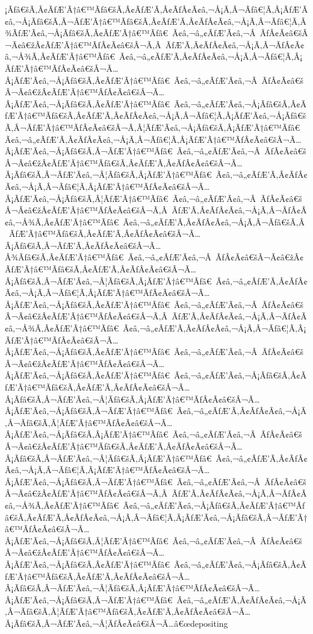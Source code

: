 \documentclass{article}
\begin{document}
\begin{outline}[enumerate]
¡Ãƒâ€šÃ‚Â¢ÃƒÆ’Ã†â€™Ãƒâ€šÃ‚Â¢ÃƒÆ’Ã‚Â¢ÃƒÂ¢Ã¢â‚¬Å¡Ã‚Â¬Ãƒâ€¦Ã‚Â¡ÃƒÆ’Ã¢â‚¬Å¡Ãƒâ€šÃ‚Â¬ÃƒÆ’Ã†â€™Ãƒâ€šÃ‚Â¢ÃƒÆ’Ã‚Â¢ÃƒÂ¢Ã¢â‚¬Å¡Ã‚Â¬Ãƒâ€¦Ã‚Â¾ÃƒÆ’Ã¢â‚¬Å¡Ãƒâ€šÃ‚Â¢ÃƒÆ’Ã†â€™Ãƒâ€ Ã¢â‚¬â„¢ÃƒÆ’Ã¢â‚¬Â ÃƒÂ¢Ã¢â€šÂ¬Ã¢â€žÂ¢ÃƒÆ’Ã†â€™ÃƒÂ¢Ã¢â€šÂ¬Ã‚Â ÃƒÆ’Ã‚Â¢ÃƒÂ¢Ã¢â‚¬Å¡Ã‚Â¬ÃƒÂ¢Ã¢â‚¬Å¾Ã‚Â¢ÃƒÆ’Ã†â€™Ãƒâ€ Ã¢â‚¬â„¢ÃƒÆ’Ã‚Â¢ÃƒÂ¢Ã¢â‚¬Å¡Ã‚Â¬Ãƒâ€¦Ã‚Â¡ÃƒÆ’Ã†â€™ÃƒÂ¢Ã¢â€šÂ¬Ã…Â¡ÃƒÆ’Ã¢â‚¬Å¡Ãƒâ€šÃ‚Â¢ÃƒÆ’Ã†â€™Ãƒâ€ Ã¢â‚¬â„¢ÃƒÆ’Ã¢â‚¬Â ÃƒÂ¢Ã¢â€šÂ¬Ã¢â€žÂ¢ÃƒÆ’Ã†â€™ÃƒÂ¢Ã¢â€šÂ¬Ã…Â¡ÃƒÆ’Ã¢â‚¬Å¡Ãƒâ€šÃ‚Â¢ÃƒÆ’Ã†â€™Ãƒâ€ Ã¢â‚¬â„¢ÃƒÆ’Ã¢â‚¬Å¡Ãƒâ€šÃ‚Â¢ÃƒÆ’Ã†â€™Ãƒâ€šÃ‚Â¢ÃƒÆ’Ã‚Â¢ÃƒÂ¢Ã¢â‚¬Å¡Ã‚Â¬Ãƒâ€¦Ã‚Â¡ÃƒÆ’Ã¢â‚¬Å¡Ãƒâ€šÃ‚Â¬ÃƒÆ’Ã†â€™ÃƒÂ¢Ã¢â€šÂ¬Ã‚Â¦ÃƒÆ’Ã¢â‚¬Å¡Ãƒâ€šÃ‚Â¡ÃƒÆ’Ã†â€™Ãƒâ€ Ã¢â‚¬â„¢ÃƒÆ’Ã‚Â¢ÃƒÂ¢Ã¢â‚¬Å¡Ã‚Â¬Ãƒâ€¦Ã‚Â¡ÃƒÆ’Ã†â€™ÃƒÂ¢Ã¢â€šÂ¬Ã…Â¡ÃƒÆ’Ã¢â‚¬Å¡Ãƒâ€šÃ‚Â¬ÃƒÆ’Ã†â€™Ãƒâ€ Ã¢â‚¬â„¢ÃƒÆ’Ã¢â‚¬Â ÃƒÂ¢Ã¢â€šÂ¬Ã¢â€žÂ¢ÃƒÆ’Ã†â€™Ãƒâ€šÃ‚Â¢ÃƒÆ’Ã‚Â¢ÃƒÂ¢Ã¢â€šÂ¬Ã…Â¡Ãƒâ€šÃ‚Â¬ÃƒÆ’Ã¢â‚¬Â¦Ãƒâ€šÃ‚Â¡ÃƒÆ’Ã†â€™Ãƒâ€ Ã¢â‚¬â„¢ÃƒÆ’Ã‚Â¢ÃƒÂ¢Ã¢â‚¬Å¡Ã‚Â¬Ãƒâ€¦Ã‚Â¡ÃƒÆ’Ã†â€™ÃƒÂ¢Ã¢â€šÂ¬Ã…Â¡ÃƒÆ’Ã¢â‚¬Å¡Ãƒâ€šÃ‚Â¦ÃƒÆ’Ã†â€™Ãƒâ€ Ã¢â‚¬â„¢ÃƒÆ’Ã¢â‚¬Â ÃƒÂ¢Ã¢â€šÂ¬Ã¢â€žÂ¢ÃƒÆ’Ã†â€™ÃƒÂ¢Ã¢â€šÂ¬Ã‚Â ÃƒÆ’Ã‚Â¢ÃƒÂ¢Ã¢â‚¬Å¡Ã‚Â¬ÃƒÂ¢Ã¢â‚¬Å¾Ã‚Â¢ÃƒÆ’Ã†â€™Ãƒâ€ Ã¢â‚¬â„¢ÃƒÆ’Ã‚Â¢ÃƒÂ¢Ã¢â‚¬Å¡Ã‚Â¬Ãƒâ€šÃ‚Â ÃƒÆ’Ã†â€™Ãƒâ€šÃ‚Â¢ÃƒÆ’Ã‚Â¢ÃƒÂ¢Ã¢â€šÂ¬Ã…Â¡Ãƒâ€šÃ‚Â¬ÃƒÆ’Ã‚Â¢ÃƒÂ¢Ã¢â€šÂ¬Ã…Â¾Ãƒâ€šÃ‚Â¢ÃƒÆ’Ã†â€™Ãƒâ€ Ã¢â‚¬â„¢ÃƒÆ’Ã¢â‚¬Â ÃƒÂ¢Ã¢â€šÂ¬Ã¢â€žÂ¢ÃƒÆ’Ã†â€™Ãƒâ€šÃ‚Â¢ÃƒÆ’Ã‚Â¢ÃƒÂ¢Ã¢â€šÂ¬Ã…Â¡Ãƒâ€šÃ‚Â¬ÃƒÆ’Ã¢â‚¬Â¦Ãƒâ€šÃ‚Â¡ÃƒÆ’Ã†â€™Ãƒâ€ Ã¢â‚¬â„¢ÃƒÆ’Ã‚Â¢ÃƒÂ¢Ã¢â‚¬Å¡Ã‚Â¬Ãƒâ€¦Ã‚Â¡ÃƒÆ’Ã†â€™ÃƒÂ¢Ã¢â€šÂ¬Ã…Â¡ÃƒÆ’Ã¢â‚¬Å¡Ãƒâ€šÃ‚Â¢ÃƒÆ’Ã†â€™Ãƒâ€ Ã¢â‚¬â„¢ÃƒÆ’Ã¢â‚¬Â ÃƒÂ¢Ã¢â€šÂ¬Ã¢â€žÂ¢ÃƒÆ’Ã†â€™ÃƒÂ¢Ã¢â€šÂ¬Ã‚Â ÃƒÆ’Ã‚Â¢ÃƒÂ¢Ã¢â‚¬Å¡Ã‚Â¬ÃƒÂ¢Ã¢â‚¬Å¾Ã‚Â¢ÃƒÆ’Ã†â€™Ãƒâ€ Ã¢â‚¬â„¢ÃƒÆ’Ã‚Â¢ÃƒÂ¢Ã¢â‚¬Å¡Ã‚Â¬Ãƒâ€¦Ã‚Â¡ÃƒÆ’Ã†â€™ÃƒÂ¢Ã¢â€šÂ¬Ã…Â¡ÃƒÆ’Ã¢â‚¬Å¡Ãƒâ€šÃ‚Â¢ÃƒÆ’Ã†â€™Ãƒâ€ Ã¢â‚¬â„¢ÃƒÆ’Ã¢â‚¬Â ÃƒÂ¢Ã¢â€šÂ¬Ã¢â€žÂ¢ÃƒÆ’Ã†â€™ÃƒÂ¢Ã¢â€šÂ¬Ã…Â¡ÃƒÆ’Ã¢â‚¬Å¡Ãƒâ€šÃ‚Â¢ÃƒÆ’Ã†â€™Ãƒâ€ Ã¢â‚¬â„¢ÃƒÆ’Ã¢â‚¬Å¡Ãƒâ€šÃ‚Â¢ÃƒÆ’Ã†â€™Ãƒâ€šÃ‚Â¢ÃƒÆ’Ã‚Â¢ÃƒÂ¢Ã¢â€šÂ¬Ã…Â¡Ãƒâ€šÃ‚Â¬ÃƒÆ’Ã¢â‚¬Â¦Ãƒâ€šÃ‚Â¡ÃƒÆ’Ã†â€™ÃƒÂ¢Ã¢â€šÂ¬Ã…Â¡ÃƒÆ’Ã¢â‚¬Å¡Ãƒâ€šÃ‚Â¬ÃƒÆ’Ã†â€™Ãƒâ€ Ã¢â‚¬â„¢ÃƒÆ’Ã‚Â¢ÃƒÂ¢Ã¢â‚¬Å¡Ã‚Â¬Ãƒâ€šÃ‚Â¦ÃƒÆ’Ã†â€™ÃƒÂ¢Ã¢â€šÂ¬Ã…Â¡ÃƒÆ’Ã¢â‚¬Å¡Ãƒâ€šÃ‚Â¡ÃƒÆ’Ã†â€™Ãƒâ€ Ã¢â‚¬â„¢ÃƒÆ’Ã¢â‚¬Â ÃƒÂ¢Ã¢â€šÂ¬Ã¢â€žÂ¢ÃƒÆ’Ã†â€™Ãƒâ€šÃ‚Â¢ÃƒÆ’Ã‚Â¢ÃƒÂ¢Ã¢â€šÂ¬Ã…Â¡Ãƒâ€šÃ‚Â¬ÃƒÆ’Ã¢â‚¬Â¦Ãƒâ€šÃ‚Â¡ÃƒÆ’Ã†â€™Ãƒâ€ Ã¢â‚¬â„¢ÃƒÆ’Ã‚Â¢ÃƒÂ¢Ã¢â‚¬Å¡Ã‚Â¬Ãƒâ€¦Ã‚Â¡ÃƒÆ’Ã†â€™ÃƒÂ¢Ã¢â€šÂ¬Ã…Â¡ÃƒÆ’Ã¢â‚¬Å¡Ãƒâ€šÃ‚Â¬ÃƒÆ’Ã†â€™Ãƒâ€ Ã¢â‚¬â„¢ÃƒÆ’Ã¢â‚¬Â ÃƒÂ¢Ã¢â€šÂ¬Ã¢â€žÂ¢ÃƒÆ’Ã†â€™ÃƒÂ¢Ã¢â€šÂ¬Ã‚Â ÃƒÆ’Ã‚Â¢ÃƒÂ¢Ã¢â‚¬Å¡Ã‚Â¬ÃƒÂ¢Ã¢â‚¬Å¾Ã‚Â¢ÃƒÆ’Ã†â€™Ãƒâ€ Ã¢â‚¬â„¢ÃƒÆ’Ã¢â‚¬Å¡Ãƒâ€šÃ‚Â¢ÃƒÆ’Ã†â€™Ãƒâ€šÃ‚Â¢ÃƒÆ’Ã‚Â¢ÃƒÂ¢Ã¢â‚¬Å¡Ã‚Â¬Ãƒâ€¦Ã‚Â¡ÃƒÆ’Ã¢â‚¬Å¡Ãƒâ€šÃ‚Â¬ÃƒÆ’Ã†â€™ÃƒÂ¢Ã¢â€šÂ¬Ã…Â¡ÃƒÆ’Ã¢â‚¬Å¡Ãƒâ€šÃ‚Â¦ÃƒÆ’Ã†â€™Ãƒâ€ Ã¢â‚¬â„¢ÃƒÆ’Ã¢â‚¬Â ÃƒÂ¢Ã¢â€šÂ¬Ã¢â€žÂ¢ÃƒÆ’Ã†â€™ÃƒÂ¢Ã¢â€šÂ¬Ã…Â¡ÃƒÆ’Ã¢â‚¬Å¡Ãƒâ€šÃ‚Â¢ÃƒÆ’Ã†â€™Ãƒâ€ Ã¢â‚¬â„¢ÃƒÆ’Ã¢â‚¬Å¡Ãƒâ€šÃ‚Â¢ÃƒÆ’Ã†â€™Ãƒâ€šÃ‚Â¢ÃƒÆ’Ã‚Â¢ÃƒÂ¢Ã¢â€šÂ¬Ã…Â¡Ãƒâ€šÃ‚Â¬ÃƒÆ’Ã¢â‚¬Â¦Ãƒâ€šÃ‚Â¡ÃƒÆ’Ã†â€™ÃƒÂ¢Ã¢â€šÂ¬Ã…Â¡ÃƒÆ’Ã¢â‚¬Å¡Ãƒâ€šÃ‚Â¬ÃƒÆ’Ã†â€™Ãƒâ€ Ã¢â‚¬â„¢ÃƒÆ’Ã‚Â¢ÃƒÂ¢Ã¢â‚¬Å¡Ã‚Â¬Ãƒâ€šÃ‚Â¦ÃƒÆ’Ã†â€™Ãƒâ€šÃ‚Â¢ÃƒÆ’Ã‚Â¢ÃƒÂ¢Ã¢â€šÂ¬Ã…Â¡Ãƒâ€šÃ‚Â¬ÃƒÆ’Ã¢â‚¬Â¦ÃƒÂ¢Ã¢â€šÂ¬Ã…â€œdepositing 
\end{outline}
\end{document}

